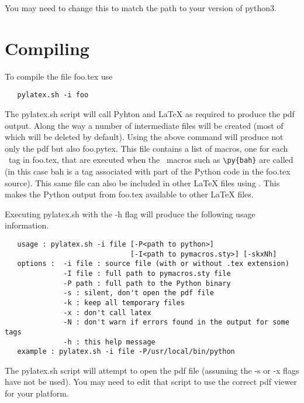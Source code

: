 \documentclass[12pt]{article}
\begin{document}
You may need to change this to match the path to your version of {\tts python3}.

\section{Compiling}
To compile the file {\tts foo.tex} use

\begin{lstlisting}
   pylatex.sh -i foo
\end{lstlisting}

The {\tts pylatex.sh} script will call Pyhton and LaTeX as required to produce the
pdf output. Along the way a number of intermediate files will be created (most of
which will be deleted by default). Using the above command will produce not only
the pdf but also {\tts foo.pytex}. This file contains a list of macros, one for
each \pyLaTeX\ tag in {\tts foo.tex}, that are executed when the \pyLaTeX\ macros
such as {\tts\verb|\py{bah}|} are called (in this case {\tts bah} is a tag
associated with part of the Python code in the {\tts foo.tex} source). This same
file can also be included in other LaTeX files using
{\tts\verb||}. This makes the Python output from {\tts foo.tex}
available to other LaTeX files.

Executing {\tts pylatex.sh} with the {\tts -h} flag will produce the following
usage information.

\begin{lstlisting}
   usage : pylatex.sh -i file [-P<path to python>]
                              [-I<path to pymacros.sty>] [-skxNh]
   options :  -i file : source file (with or without .tex extension)
              -I file : full path to pymacros.sty file
              -P path : full path to the Python binary
              -s : silent, don't open the pdf file
              -k : keep all temporary files
              -x : don't call latex
              -N : don't warn if errors found in the output for some tags
              -h : this help message
   example : pylatex.sh -i file -P/usr/local/bin/python
\end{lstlisting}

The {\tts pylatex.sh} script will attempt to open the pdf file (assuming the {\tts
-s} or {\tts -x} flags have not be used). You may need to edit that script to use
the correct pdf viewer for your platform.

\goodbreak
\end{document}
